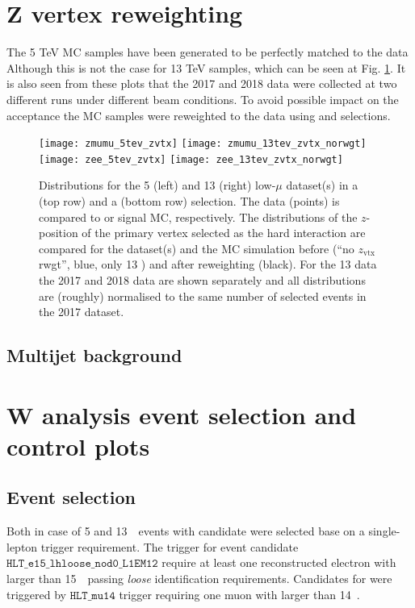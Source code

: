      \section{Z vertex reweighting }
     The 5 TeV MC samples have been generated to be perfectly matched to the data 
     Although this is not the case for 13 TeV samples, which can be seen at Fig. \ref{fig:zvtx}. 
     It is also seen from these plots that the 2017 and 2018 data were collected at two different runs under different beam conditions. 
   	 To avoid possible impact on the acceptance the MC samples were reweighted to the data using \Zee and \Zmm selections.
     
     \begin{figure}[tph]
     	\centering
     	\texttt{[image: zmumu\_5tev\_zvtx]}%
     	\texttt{[image: zmumu\_13tev\_zvtx\_norwgt]}
     	\texttt{[image: zee\_5tev\_zvtx]}%
     	\texttt{[image: zee\_13tev\_zvtx\_norwgt]}
     	\caption{Distributions for the 5 \TeV{} (left) and 13 \TeV{} (right)
     		low-$\mu$ dataset(s) in a \Zgmm (top row) and a \Zgee (bottom row)
     		selection. The data (points) is compared to \Zgmm or \Zgee signal
     		MC, respectively. The distributions of the $z$-position of the
     		primary vertex selected as the hard interaction are compared for
     		the dataset(s) and the MC simulation before (``no $z_\mathrm{vtx}$
     		rwgt'', blue, only 13 \TeV{}) and after reweighting (black). For
     		the 13 \TeV{} data the 2017 and 2018 data are shown separately and
     		all distributions are (roughly) normalised to the same number of
     		selected events in the 2017 dataset. }
     	\label{fig:zvtx}
     \end{figure}
    \subsection{Multijet background}
 
\section{W analysis event selection and control plots}
\label{sec:selection}

\subsection{Event selection}
\label{subsec:wselection}
Both in case of 5 and 13~\TeV\ events with \Wln{} candidate were selected base on a single-lepton trigger requirement.
The trigger for \Wen event candidate $\texttt{HLT\_e15\_lhloose\_nod0\_L1EM12}$ require at least one reconstructed electron with \ET larger than 15~\GeV\ passing \emph{loose} identification requirements. Candidates for \Wmn were triggered by $\texttt{HLT\_mu14}$ trigger requiring one muon with \ET larger than 14~\GeV.

